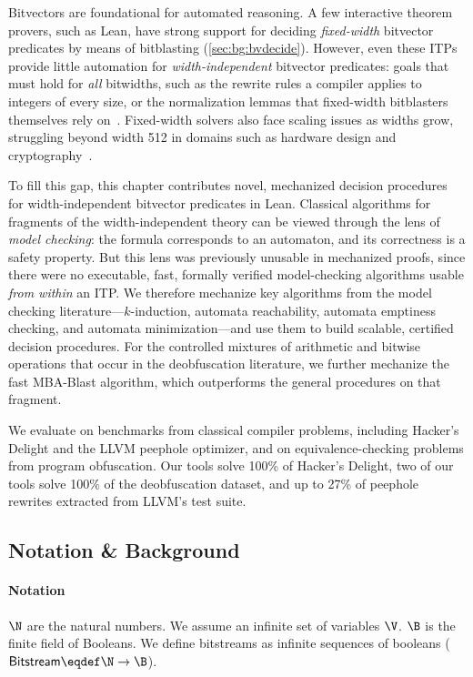 Bitvectors are foundational for automated reasoning. A few
interactive theorem provers, such as Lean, have strong support for deciding
\emph{fixed-width} bitvector predicates by means of bitblasting
(\cref{sec:bg:bvdecide}). However, even these ITPs provide little automation
for \emph{width-independent} bitvector predicates: goals that must hold for
\emph{all} bitwidths, such as the rewrite rules a compiler applies to
integers of every size, or the normalization lemmas that fixed-width
bitblasters themselves rely on~\citep{niemetz2024scalable}. Fixed-width
solvers also face scaling issues as widths grow, struggling beyond width 512
in domains such as hardware design and
cryptography~\citep{lopes2018future,mukherjee2024hydra}.

To fill this gap, this chapter contributes novel, mechanized decision
procedures for width-independent bitvector predicates in Lean. Classical
algorithms for fragments of the width-independent theory can be viewed
through the lens of \emph{model checking}: the formula corresponds to an
automaton, and its correctness is a safety property. But this lens was
previously unusable in mechanized proofs, since there were no executable,
fast, formally verified model-checking algorithms usable \emph{from within}
an ITP. We therefore mechanize key algorithms from the model checking
literature---$k$-induction, automata reachability, automata emptiness
checking, and automata minimization---and use them to build scalable,
certified decision procedures. For the controlled mixtures of arithmetic and
bitwise operations that occur in the deobfuscation literature, we further
mechanize the fast MBA-Blast algorithm, which outperforms the general
procedures on that fragment.

We evaluate on benchmarks from classical compiler problems, including
Hacker's Delight and the LLVM peephole optimizer, and on equivalence-checking
problems from program obfuscation. Our tools solve 100\% of Hacker's Delight,
two of our tools solve 100\% of the deobfuscation dataset, and up to 27\% of
peephole rewrites extracted from LLVM's test suite.

\subsection{Notation \& Background}
\label{sec:swbv:background}

\paragraph{Notation} $\N$ are the natural numbers. We assume an infinite set of variables $\V$.
$\B$ is the finite field of Booleans.
%
We define bitstreams as infinite sequences of booleans ($\bitstream \eqdef \N
\to \B$).

